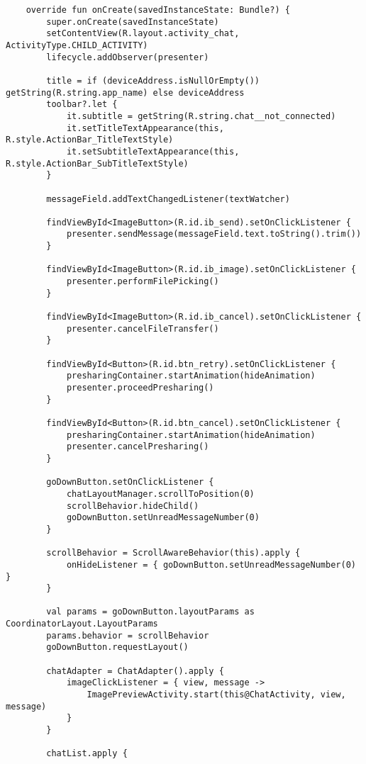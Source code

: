 \begin{lstlisting}
    override fun onCreate(savedInstanceState: Bundle?) {
        super.onCreate(savedInstanceState)
        setContentView(R.layout.activity_chat, ActivityType.CHILD_ACTIVITY)
        lifecycle.addObserver(presenter)

        title = if (deviceAddress.isNullOrEmpty()) getString(R.string.app_name) else deviceAddress
        toolbar?.let {
            it.subtitle = getString(R.string.chat__not_connected)
            it.setTitleTextAppearance(this, R.style.ActionBar_TitleTextStyle)
            it.setSubtitleTextAppearance(this, R.style.ActionBar_SubTitleTextStyle)
        }

        messageField.addTextChangedListener(textWatcher)

        findViewById<ImageButton>(R.id.ib_send).setOnClickListener {
            presenter.sendMessage(messageField.text.toString().trim())
        }

        findViewById<ImageButton>(R.id.ib_image).setOnClickListener {
            presenter.performFilePicking()
        }

        findViewById<ImageButton>(R.id.ib_cancel).setOnClickListener {
            presenter.cancelFileTransfer()
        }

        findViewById<Button>(R.id.btn_retry).setOnClickListener {
            presharingContainer.startAnimation(hideAnimation)
            presenter.proceedPresharing()
        }

        findViewById<Button>(R.id.btn_cancel).setOnClickListener {
            presharingContainer.startAnimation(hideAnimation)
            presenter.cancelPresharing()
        }

        goDownButton.setOnClickListener {
            chatLayoutManager.scrollToPosition(0)
            scrollBehavior.hideChild()
            goDownButton.setUnreadMessageNumber(0)
        }

        scrollBehavior = ScrollAwareBehavior(this).apply {
            onHideListener = { goDownButton.setUnreadMessageNumber(0) }
        }

        val params = goDownButton.layoutParams as CoordinatorLayout.LayoutParams
        params.behavior = scrollBehavior
        goDownButton.requestLayout()

        chatAdapter = ChatAdapter().apply {
            imageClickListener = { view, message ->
                ImagePreviewActivity.start(this@ChatActivity, view, message)
            }
        }

        chatList.apply {


\end{lstlisting}
